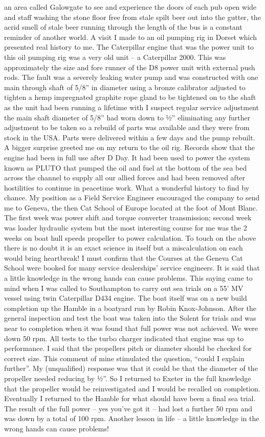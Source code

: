 an area called Galowgate to see and experience the doors of each pub open wide
and staff washing the stone floor free from stale spilt beer out into the
gutter, the acrid smell of stale beer running through the length of the bus is
a constant reminder of another world. A visit I made to an oil pumping rig in
Dorset which presented real history to me.  The Caterpillar engine that was the
power unit to this oil pumping rig was a very old unit – a Caterpillar 2000.
This was approximately the size and fore runner of the D8 power unit with
external push rods.  The fault was a severely leaking water pump and was
constructed with one main through shaft of 5/8'' in diameter using a bronze
calibrator adjusted to tighten a hemp impregnated graphite rope gland to be
tightened on to the shaft as the unit had been running a lifetime with I
suspect regular service adjustment the main shaft diameter of 5/8'' had worn
down to ½'' eliminating any further adjustment to be taken so a rebuild of
parts was available and they were from stock in the USA.  Parts were delivered
within a few days and the pump rebuilt.  A bigger surprise greeted me on my
return to the oil rig.  Records show that the engine had been in full use after
D Day.  It had been used to power the system known as PLUTO that pumped the oil
and fuel at the bottom of the sea bed across the channel to supply all our
allied forces and had been removed after hostilities to continue in peacetime
work.  What a wonderful history to find by chance. My position as a Field
Service Engineer encouraged the company to send me to Geneva, the then Cat
School of Europe located at the foot of Mont Blanc.  The first week was power
shift and torque converter transmission; second week was loader hydraulic
system but the most interesting course for me was the 2 weeks on boat hull
speeds propeller to power calculation.  To touch on the above there is no doubt
it is an exact science in itself but a miscalculation on each would bring
heartbreak!  I must confirm that the Courses at the Geneva Cat School were
booked for many service dealerships' service engineers. It is said that a
little knowledge in the wrong hands can cause problems.  This saying came to
mind when I was called to Southampton to carry out sea trials on a 55' MV
vessel using twin Caterpillar D434 engine.  The boat itself was on a new build
completion up the Hamble in a boatyard run by Robin Knox-Johnson.  After the
general inspection and test the boat was taken into the Solent for trials and
was near to completion when it was found that full power was not achieved.  We
were down 50 rpm.  All tests to the turbo charger indicated that engine was up
to performance.  I said that the propellers pitch or diameter should be checked
for correct size. This comment of mine stimulated the question, ``could I
explain further''.  My (unqualified) response was that it could be that the
diameter of the propeller needed reducing by ½''.  So I returned to Exeter in
the full knowledge that the propeller would be reinvestigated and I would be
recalled on completion.  Eventually I returned to the Hamble for what should
have been a final sea trial.  The result of the full power – yes you've got
it – had lost a further 50 rpm and was down by a total of 100 rpm. Another
lesson in life – a little knowledge in the wrong hands can cause problems!
